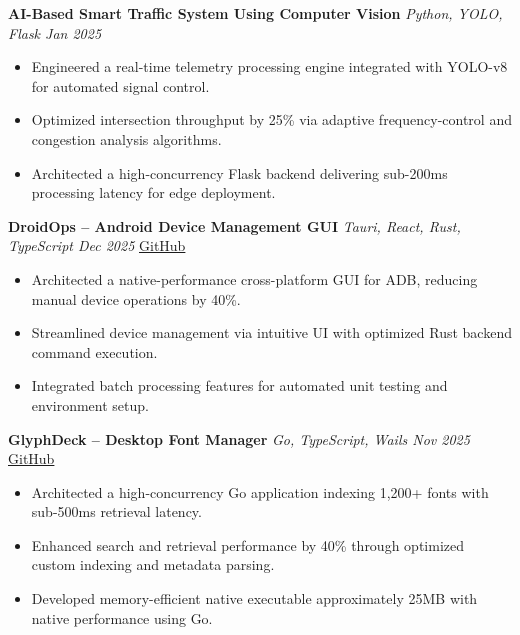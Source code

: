 \documentclass[10pt, a4paper]{article}
\begin{document}
\vspace{2pt}

\textbf{AI-Based Smart Traffic System Using Computer Vision} \hfill \textit{Python, YOLO, Flask \quad Jan 2025}
\begin{itemize}
\item Engineered a real-time telemetry processing engine integrated with YOLO-v8 for automated signal control.
\item Optimized intersection throughput by 25\% via adaptive frequency-control and congestion analysis algorithms.
\item Architected a high-concurrency Flask backend delivering sub-200ms processing latency for edge deployment.
\end{itemize}

\vspace{2pt}

\textbf{DroidOps -- Android Device Management GUI} \hfill \textit{Tauri, React, Rust, TypeScript \quad Dec 2025} \quad \href{https://github.com/bbinxx/droidops}{GitHub}
\begin{itemize}
\item Architected a native-performance cross-platform GUI for ADB, reducing manual device operations by 40\%.
\item Streamlined device management via intuitive UI with optimized Rust backend command execution.
\item Integrated batch processing features for automated unit testing and environment setup.
\end{itemize}

\vspace{2pt}

\textbf{GlyphDeck -- Desktop Font Manager} \hfill \textit{Go, TypeScript, Wails \quad Nov 2025} \quad \href{https://github.com/bbinxx/GlyphDeck}{GitHub}
\begin{itemize}
\item Architected a high-concurrency Go application indexing 1,200+ fonts with sub-500ms retrieval latency.
\item Enhanced search and retrieval performance by 40\% through optimized custom indexing and metadata parsing.
\item Developed memory-efficient native executable approximately 25MB with native performance using Go.
\end{itemize}

\end{document}
